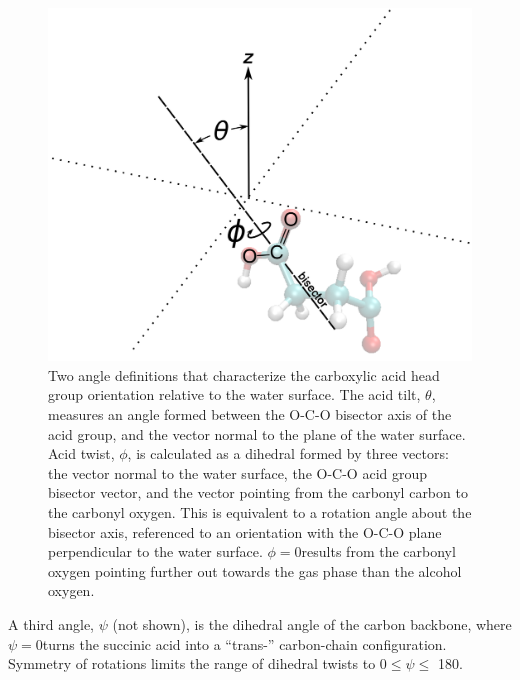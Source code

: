 \begin{figure}[h!]
	\begin{center}
		\includegraphics[scale=1.0]{images/bond-angles/bond-angle-definitions-small.png}
		\caption{Two angle definitions that characterize the carboxylic acid head group orientation relative to the water surface. The acid tilt, $\theta$, measures an angle formed between the O-C-O bisector axis of the acid group, and the vector normal to the plane of the water surface. Acid twist, $\phi$, is calculated as a dihedral formed by three vectors: the vector normal to the water surface, the O-C-O acid group bisector vector, and the vector pointing from the carbonyl carbon to the carbonyl oxygen. This is equivalent to a rotation angle about the bisector axis, referenced to an orientation with the O-C-O plane perpendicular to the water surface. $\phi = 0$\textdegree results from the carbonyl oxygen pointing further out towards the gas phase than the alcohol oxygen.}
		\label{fig:angle-definitions}
	\end{center}
\end{figure}

A third angle, $\psi$ (not shown), is the dihedral angle of the carbon backbone, where $\psi = 0$\textdegree turns the succinic acid into a ``trans-'' carbon-chain configuration. Symmetry of rotations limits the range of dihedral twists to 0\textdegree $\le \psi \le$ 180\textdegree.


